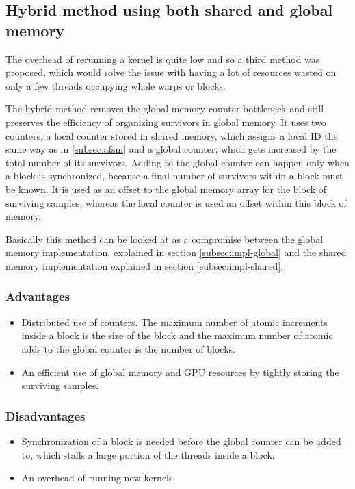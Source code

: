\subsection{Hybrid method using both shared and global memory}\label{subsec:impl-hybrid}

The overhead of rerunning a kernel is quite low and so a third method was proposed, which would solve the issue with having a lot of resources wasted on only a few threads occupying whole warps or blocks.

The hybrid method removes the global memory counter bottleneck and still preserves the efficiency of organizing survivors in global memory. It uses two counters, a local counter stored in shared memory, which assigns a local ID the same way as in \ref{subsec:afsm} and a global counter, which gets increased by the total number of its survivors. Adding to the global counter can happen only when a block is synchronized, because a final number of survivors within a block must be known. It is used as an offset to the global memory array for the block of surviving samples, whereas the local counter is used an offset within this block of memory.

Basically this method can be looked at as a compromise between the global memory implementation, explained in section \ref{subsec:impl-global} and the shared memory implementation explained in section \ref{subsec:impl-shared}.

\subsubsection{Advantages}

\begin{itemize}
	\item Distributed use of counters. The maximum number of atomic increments inside a block is the size of the block and the maximum number of atomic adds to the global counter is the number of blocks.
	\item An efficient use of global memory and GPU resources by tightly storing the surviving samples.
\end{itemize}

\subsubsection{Disadvantages}

\begin{itemize}
	\item Synchronization of a block is needed before the global counter can be added to, which stalls a large portion of the threads inside a block.
	\item An overhead of running new kernels.
\end{itemize}

